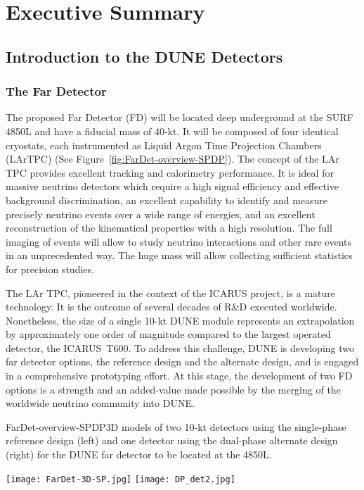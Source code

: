 \chapter{Executive Summary}
\label{ch:detectors-execsumm}



\section{Introduction to the DUNE Detectors}
\label{sec:intro-dune-det}

\subsection{The Far Detector}
\label{sec:intro-dune-far-det}

The proposed Far Detector (FD) will be located deep underground at the SURF 4850L and have
a  fiducial mass of 40-kt. It 
will be composed of four identical cryostats, each instrumented as Liquid Argon Time Projection Chambers (LArTPC)
(See Figure~\ref{fig:FarDet-overview-SPDP}). The concept of the LAr TPC provides
excellent tracking and calorimetry performance. It is ideal for massive neutrino detectors which require a high signal
efficiency and effective background discrimination,  an excellent capability to identify and measure
precisely neutrino events over a wide range of energies, and an excellent reconstruction of the kinematical properties
with a high resolution. The full imaging of events will allow to study neutrino interactions and
other rare events in an unprecedented way. The huge mass will allow collecting sufficient statistics for precision
studies.

The LAr TPC, pioneered in the context of the ICARUS project, is a mature technology. It is the outcome
of several decades of R\&D executed worldwide.  Nonetheless, the size of a single 10-kt DUNE module represents an extrapolation by approximately one order of magnitude compared to the largest operated detector, the ICARUS~T600. To address this challenge, DUNE is developing two far detector options, the reference design and the alternate design, and is engaged in a 
comprehensive prototyping effort. At this stage, the development of two FD options is a strength and an added-value 
made possible by the merging of the worldwide neutrino community into DUNE.

\begin{cdrfigure}{FarDet-overview-SPDP}{3D models of two 10-kt detectors using the single-phase reference design (left) and one detector using the dual-phase alternate design (right) for the DUNE far detector to be located at the 4850L. }
\centering
\begin{minipage}[b]{1.0\textwidth}
\begin{center}
\texttt{[image: FarDet-3D-SP.jpg]}
\texttt{[image: DP\_det2.jpg]}
\end{center}
\end{minipage}
\end{cdrfigure}

